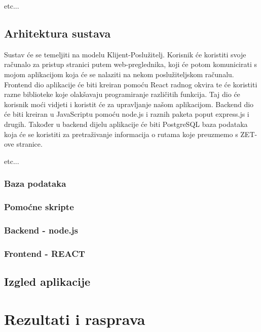 \documentclass[zavrsnirad]{fer}
\begin{document}
etc...

\section{Arhitektura sustava}

Sustav će se temeljiti na modelu Klijent-Poslužitelj. Korisnik će koristiti svoje računalo za pristup
stranici putem web-preglednika, koji će potom komunicirati s mojom aplikacijom koja će se nalaziti
na nekom poslužiteljskom računalu. Frontend dio aplikacije će biti kreiran pomoću React radnog
okvira te će koristiti razne biblioteke koje olakšavaju programiranje različitih funkcija. Taj dio će
korisnik moći vidjeti i koristit će za upravljanje našom aplikacijom. Backend dio će biti kreiran u
JavaScriptu pomoću node.js i raznih paketa poput express.js i drugih. Također u backend dijelu
aplikacije će biti PostgreSQL baza podataka koja će se koristiti za pretraživanje informacija o
rutama koje preuzmemo s ZET-ove stranice.

etc...

\subsection{Baza podataka}

\subsection{Pomoćne skripte}

\subsection{Backend - node.js}

\subsection{Frontend - REACT}

\section{Izgled aplikacije}


\chapter{Rezultati i rasprava}
\label{pog:rezultati_i_rasprava}


\end{document}
